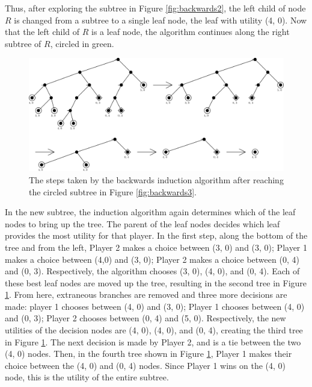 Thus, after exploring the subtree in Figure \ref{fig:backwards2}, the left child of node $R$ is changed from a subtree to a single leaf node, the leaf with utility (4, 0). Now that the left child of $R$ is a leaf node, the algorithm continues along the right subtree of $R$, circled in green.\\

\begin{figure}[H]
  \centering
  \includegraphics[width=13cm]{figures/Backwards4.png}
  \caption{The steps taken by the backwards induction algorithm after reaching the circled subtree in Figure \ref{fig:backwards3}.}
  \label{fig:backwards4}
\end{figure}

In the new subtree, the induction algorithm again determines which of the leaf nodes to bring up the tree. The parent of the leaf nodes decides which leaf provides the most utility for that player. In the first step, along the bottom of the tree and from the left, Player 2 makes a choice between (3, 0) and (3, 0); Player 1 makes a choice between (4,0) and (3, 0); Player 2 makes a choice between (0, 4) and (0, 3). Respectively, the algorithm chooses (3, 0), (4, 0), and (0, 4). Each of these best leaf nodes are moved up the tree, resulting in the second tree in Figure \ref{fig:backwards4}. From here, extraneous branches are removed and three more decisions are made: player 1 chooses between (4, 0) and (3, 0); Player 1 chooses between (4, 0) and (0, 3); Player 2 chooses between (0, 4) and (5, 0). Respectively, the new utilities of the decision nodes are (4, 0), (4, 0), and (0, 4), creating the third tree in Figure \ref{fig:backwards4}. The next decision is made by Player 2, and is a tie between the two (4, 0) nodes. Then, in the fourth tree shown in Figure \ref{fig:backwards4}, Player 1 makes their choice between the (4, 0) and (0, 4) nodes. Since Player 1 wins on the (4, 0) node, this is the utility of the entire subtree.\\

